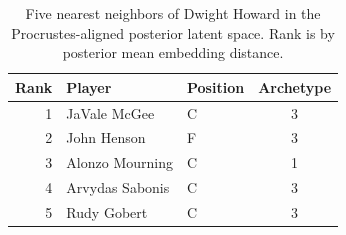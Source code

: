 \begin{table}[htbp]
  \centering\small
  \begin{tabular}{rllc}
    \toprule
    Rank & Player & Position & Archetype \\
    \midrule
    1 & JaVale McGee & C & 3 \\
    2 & John Henson & F & 3 \\
    3 & Alonzo Mourning & C & 1 \\
    4 & Arvydas Sabonis & C & 3 \\
    5 & Rudy Gobert & C & 3 \\
    \bottomrule
  \end{tabular}
  \caption{Five nearest neighbors of Dwight Howard in the Procrustes-aligned posterior latent space. Rank is by posterior mean embedding distance.}
  \label{tab:Dwight_Howard_neighbors}
\end{table}


